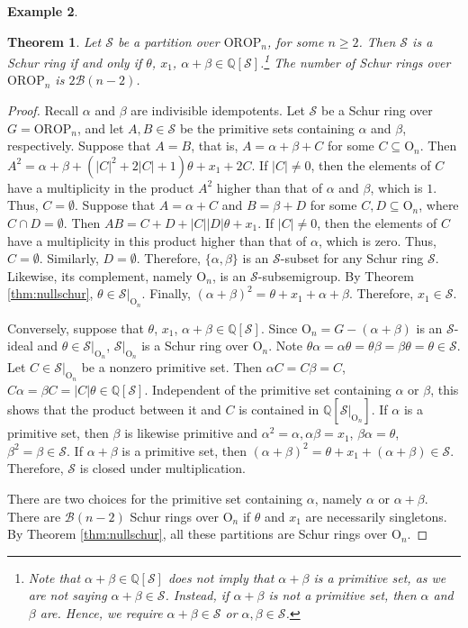 \documentclass{article}
\theoremstyle{plain}
\newtheorem{Thm}{Theorem}[section]
\theoremstyle{definition}
\newtheorem{Exam}[Thm]{Example}
\newcommand{\thmref}[1]{Theorem \ref{#1}}
\renewcommand{\S}{\mathcal{S}}
\newcommand{\Q}{\mathbb{Q}}
\newcommand{\QS}{\Q[\S]}
\newcommand{\B}{\mathscr{B}}
\renewcommand{\O}{\mathrm{O}}
\newcommand{\OROP}{\mathrm{OROP}}
\begin{document}
\begin{Exam}
  \begin{Thm}\label{thm:orop} Let $\S$ be a partition over $\OROP_{n}$, for some $n\ge2$. Then $\S$ is a Schur ring if and only if $\theta$, $x_1$, $\alpha+\beta\in \QS$.\footnote{Note that $\alpha+\beta\in \QS$ does not imply that $\alpha+\beta$ is a primitive set, as we are not saying $\alpha+\beta\in \S$. Instead, if $\alpha+\beta$ is not a primitive set, then $\alpha$ and $\beta$ are. Hence, we require $\alpha+\beta\in \S$ or $\alpha,\beta\in\S$.} The number of Schur rings over $\OROP_{n}$ is $2\B(n-2)$.
\end{Thm}
    \begin{proof}
    Recall $\alpha$ and $\beta$ are indivisible idempotents. Let $\S$ be a Schur ring over $G=\OROP_{n}$, and let $A,B\in \S$ be the primitive sets containing $\alpha$ and $\beta$, respectively. Suppose that $A=B$, that is, $A = \alpha+\beta +C$ for some $C\subseteq \O_n$. Then $A^2 = \alpha + \beta + (|C|^2+2|C|+1)\theta + x_1 + 2C$. If $|C|\neq 0$, then the elements of $C$ have a multiplicity in the product $A^2$ higher than that of $\alpha$ and $\beta$, which is $1$. Thus, $C=\emptyset$. Suppose that $A=\alpha+C$ and $B=\beta +D$ for some $C,D\subseteq \O_n$, where $C\cap D=\emptyset$. Then $AB = C+D+|C||D|\theta + x_1$. If $|C|\neq 0$, then the elements of $C$ have a multiplicity in this product higher than that of $\alpha$, which is zero. Thus, $C=\emptyset$. Similarly, $D=\emptyset$. Therefore, $\{\alpha,\beta\}$ is an $\S$-subset for any Schur ring $\S$. Likewise, its complement, namely $\O_n$, is an $\S$-subsemigroup. By \thmref{thm:nullschur}, $\theta \in \S|_{\O_n}$. Finally, $(\alpha+\beta)^2 = \theta + x_1 + \alpha+\beta$. Therefore, $x_1\in\S$.

    Conversely, suppose that $\theta$, $x_1$, $\alpha+\beta\in \QS$. Since $\O_n=G-(\alpha+\beta)$ is an $\S$-ideal and $\theta\in \S|_{\O_n}$, $\S|_{\O_n}$ is a Schur ring over $\O_n$. Note $\theta\alpha = \alpha\theta=\theta\beta=\beta\theta = \theta \in \S$. Let $C\in \S|_{\O_n}$ be a nonzero primitive set. Then $\alpha C = C\beta = C$, $C\alpha = \beta C = |C|\theta\in \QS$. Independent of the primitive set containing $\alpha$ or $\beta$, this shows that the product between it and $C$ is contained in $\Q[\S|_{\O_n}]$. If $\alpha$ is a primitive set, then $\beta$ is likewise primitive and $\alpha^2=\alpha, \alpha\beta=x_1$, $\beta\alpha=\theta$, $\beta^2=\beta\in \S$. If $\alpha+\beta$ is a primitive set, then $(\alpha+\beta)^2 = \theta+x_1+(\alpha+\beta)\in \S$. Therefore, $\S$ is closed under multiplication.
    
    There are two choices for the primitive set containing $\alpha$, namely $\alpha$ or $\alpha+\beta$. There are $\B(n-2)$ Schur rings over $\O_n$ if $\theta$ and $x_1$ are necessarily singletons. By \thmref{thm:nullschur}, all these partitions are Schur rings over $\O_n$. 
    \end{proof}
\end{Exam}
\end{document}
